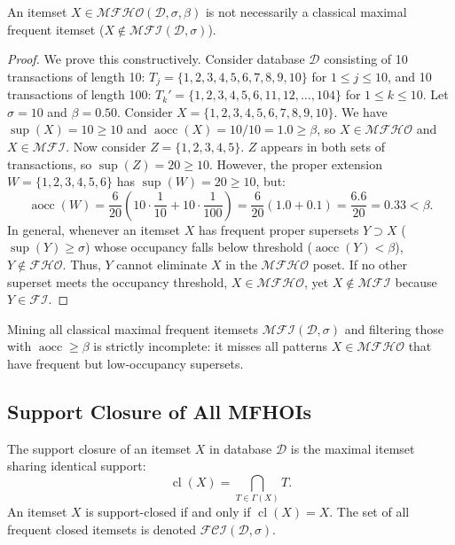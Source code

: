 \documentclass[runningheads,orivec]{llncs}
\newcommand{\supp}{\operatorname{sup}}
\newcommand{\aocc}{\operatorname{aocc}}
\newcommand{\cl}{\operatorname{cl}}
\newcommand{\FI}{\ensuremath{\mathcal{FI}}}
\newcommand{\FHO}{\ensuremath{\mathcal{FHO}}}
\newcommand{\MFI}{\ensuremath{\mathcal{MFI}}}
\newcommand{\FCI}{\ensuremath{\mathcal{FCI}}}
\newcommand{\MFHOI}{\ensuremath{\mathcal{MFHO}}}
\begin{document}
\begin{theorem}
\label{thm:mfhoi_not_mfi}
An itemset $X \in \MFHOI(\mathcal{D}, \sigma, \beta)$ is not necessarily a classical maximal frequent itemset ($X \notin \MFI(\mathcal{D}, \sigma)$).
\end{theorem}
\begin{proof}
We prove this constructively. Consider database $\mathcal{D}$ consisting of 10 transactions of length 10:
$T_j = \{1, 2, 3, 4, 5, 6, 7, 8, 9, 10\}$ for $1 \le j \le 10$, and 10 transactions of length 100:
$T_k' = \{1, 2, 3, 4, 5, 6, 11, 12, \dots, 104\}$ for $1 \le k \le 10$.
Let $\sigma = 10$ and $\beta = 0.50$.
Consider $X = \{1, 2, 3, 4, 5, 6, 7, 8, 9, 10\}$. We have $\supp(X) = 10 \ge 10$ and $\aocc(X) = 10/10 = 1.0 \ge \beta$, so $X \in \MFHOI$ and $X \in \MFI$.
Now consider $Z = \{1, 2, 3, 4, 5\}$. $Z$ appears in both sets of transactions, so $\supp(Z) = 20 \ge 10$.
However, the proper extension $W = \{1, 2, 3, 4, 5, 6\}$ has $\supp(W) = 20 \ge 10$, but:
\begin{equation*}
\aocc(W) = \frac{6}{20} \left( 10 \cdot \frac{1}{10} + 10 \cdot \frac{1}{100} \right) = \frac{6}{20} (1.0 + 0.1) = \frac{6.6}{20} = 0.33 < \beta.
\end{equation*}
In general, whenever an itemset $X$ has frequent proper supersets $Y \supset X$ ($\supp(Y) \ge \sigma$) whose occupancy falls below threshold ($\aocc(Y) < \beta$), $Y \notin \FHO$. Thus, $Y$ cannot eliminate $X$ in the $\MFHOI$ poset. If no other superset meets the occupancy threshold, $X \in \MFHOI$, yet $X \notin \MFI$ because $Y \in \FI$.
\end{proof}

\begin{corollary}
\label{cor:incompleteness}
Mining all classical maximal frequent itemsets $\MFI(\mathcal{D}, \sigma)$ and filtering those with $\aocc \ge \beta$ is strictly incomplete: it misses all patterns $X \in \MFHOI$ that have frequent but low-occupancy supersets.
\end{corollary}

\subsection{Support Closure of All MFHOIs}

\begin{definition}
The support closure of an itemset $X$ in database $\mathcal{D}$ is the maximal itemset sharing identical support:
\begin{equation}
\cl(X) = \bigcap_{T \in \Gamma(X)} T.
\end{equation}
An itemset $X$ is support-closed if and only if $\cl(X) = X$. The set of all frequent closed itemsets is denoted $\FCI(\mathcal{D}, \sigma)$.
\end{definition}
\end{document}
